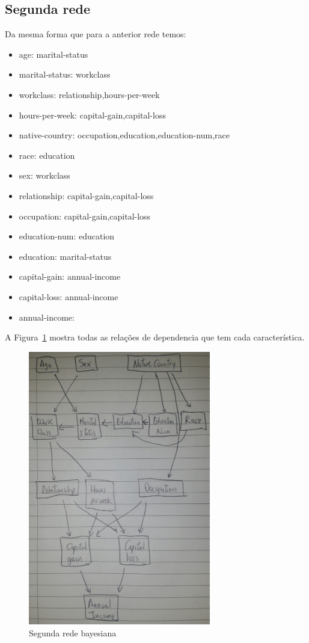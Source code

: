 \subsection{Segunda rede}
	Da mesma forma que para a anterior rede temos:
	\begin{itemize}
		\item age: marital-status
		\item marital-status: workclass
		\item workclass: relationship,hours-per-week
		\item hours-per-week: capital-gain,capital-loss
		\item native-country: occupation,education,education-num,race
		\item race: education
		\item sex: workclass
		\item relationship: capital-gain,capital-loss
		\item occupation: capital-gain,capital-loss
		\item education-num: education
		\item education: marital-status
		\item capital-gain: annual-income
		\item capital-loss: annual-income
		\item annual-income:
	\end{itemize}
	A Figura~\ref{fig:rede2} mostra todas as relações de dependencia que tem cada característica.
	\begin{figure}[ht]
		\centering
		\includegraphics[height=12cm]{images/rede2}
		\caption{Segunda rede bayesiana}
		\label{fig:rede2}
	\end{figure}
